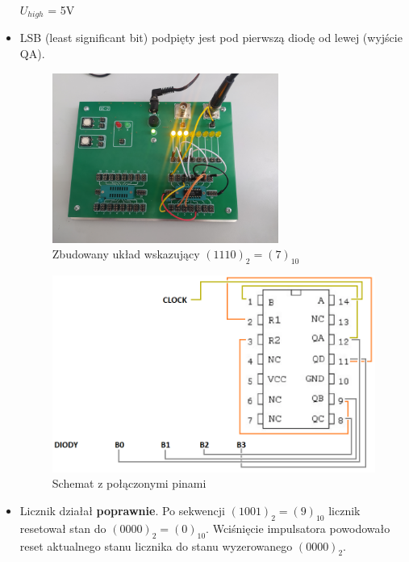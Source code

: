 \begin{itemize}
\begin{center}
            $U_{high}$ = 5V
        \end{center}
    \item LSB (least significant bit) podpięty jest pod pierwszą diodę od lewej (wyjście QA).
        \begin{figure}[H]
            \centering
            \includegraphics[width=0.7\textwidth]{img/mod10/1653500524710_scaled.png}
            \caption{Zbudowany układ wskazujący $(1110)_2 = (7)_{10}$}
            \label{licznik_mod10:zbudowany_uklad}
        \end{figure}
        
        \begin{figure}[H]
            \centering
            \includegraphics[width=\textwidth]{img/schemes_w_pins/mod10_w_pins.png}
            \caption{Schemat z połączonymi pinami}
            \label{licznik_mod10:schemat_z_pinami}
        \end{figure}
        
    \item Licznik działał \textbf{poprawnie}. Po sekwencji $(1001)_2 = (9)_{10}$ licznik resetował stan do $(0000)_2 = (0)_{10}$. Wciśnięcie impulsatora powodowało reset aktualnego stanu licznika do stanu wyzerowanego $(0000)_2$.
\end{itemize}